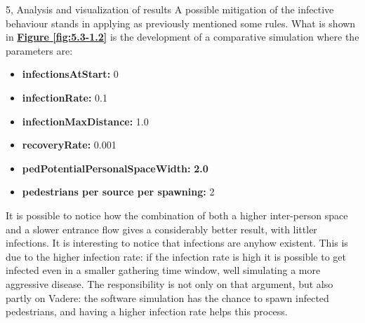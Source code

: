 \documentclass[10pt,a4paper]{article}
\begin{document}
\begin{task}{5, Analysis and visualization of results}
A possible mitigation of the infective behaviour stands in applying as previously mentioned some rules. What is shown in  \textbf{\hyperref[fig:5.3-1.2]{Figure \ref{fig:5.3-1.2}}} is the development of a comparative simulation where the parameters are:
\begin{itemize}
    \item \textbf{infectionsAtStart:} 0
    \item \textbf{infectionRate:} 0.1
    \item \textbf{infectionMaxDistance:} 1.0
    \item \textbf{recoveryRate:} 0.001
    \item \textbf{pedPotentialPersonalSpaceWidth:} \textbf{2.0}
    \item \textbf{pedestrians per source per spawning:} 2
\end{itemize}
It is possible to notice how the combination of both a higher inter-person space and a slower entrance flow gives a considerably better result, with littler infections. It is interesting to notice that infections are anyhow existent. This is due to the higher infection rate: if the infection rate is high it is possible to get infected even in a smaller gathering time window, well simulating a more aggressive disease. The responsibility is not only on that argument, but also partly on Vadere: the software simulation has the chance to spawn infected pedestrians, and having a higher infection rate helps this process.


\end{task}
\end{document}
